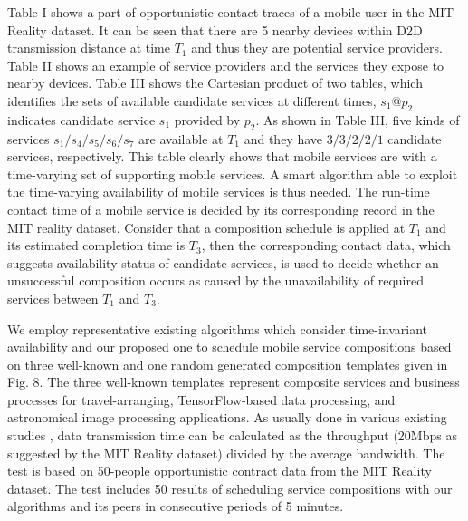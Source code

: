 \documentclass[journal]{IEEEtran}
\begin{document}
Table I shows a part of opportunistic contact traces of a mobile user in the MIT Reality dataset. It can be seen that there are 5 nearby devices within D2D transmission distance at time $T_1$ and thus they are potential service providers. Table II shows an example of service providers and the services they expose to nearby devices. Table III shows the Cartesian product of two tables, which identifies the sets of available candidate services at different times, $s_1$@$p_2$ indicates candidate service $s_1$ provided by $p_2$.
As shown in Table III, five kinds of services $s_1/s_4/s_5/s_6/s_7$ are available at $T_1$ and they have $3/3/2/2/1$ candidate services, respectively.
This table clearly shows that mobile services are with a time-varying set of supporting mobile services.
A smart algorithm able to exploit the time-varying availability of mobile services is thus needed. The run-time contact time of a mobile service is decided by its corresponding record in the MIT reality dataset. Consider that a composition schedule is applied at $T_1$ and its estimated completion time is $T_3$, then the corresponding contact data, which suggests availability status of candidate services, is used to decide whether an unsuccessful composition occurs as caused by the unavailability of required services between $T_1$ and $T_3$.

We employ representative existing algorithms \cite{Deng2017} \cite{sadiq2015service} which consider time-invariant availability and our proposed one to schedule mobile service compositions based on three well-known and one random generated composition templates given in Fig. 8. 
The three well-known templates represent composite services and business processes for travel-arranging, TensorFlow-based data processing, and astronomical image processing applications. As usually done in various existing studies \cite{Meena2016Cost, Rodriguez2014Deadline}, data transmission time can be calculated as the throughput (20Mbps as suggested by the MIT Reality dataset) divided by the average bandwidth. 
The test is based on 50-people opportunistic contract data from the MIT Reality dataset. The test includes 50 results of scheduling service compositions with our algorithms and its peers in consecutive periods of 5 minutes. 
\end{document}

